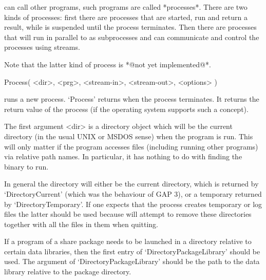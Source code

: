 


{\GAP}  can  call other programs,  such  programs are called *processes*.
There are  two  kinds of processes:  first there  are  processes that are
started, run and  return a result,  while  {\GAP} is suspended  until the
process  terminates.  Then there are  processes that will run in parallel
to {\GAP} as  subprocesses  and {\GAP} can  communicate and   control the
processes using streams.

Note that the latter kind of process is *@not yet implemented@*.


\>Process( <dir>, <prg>, <stream-in>, <stream-out>, <options> )

runs  a new process.  `Process' returns  when the process terminates.  It
returns the return value of the process (if the operating system supports
such a concept).

The first argument <dir> is a directory object which  will be the current
directory (in the usual UNIX  or MSDOS sense) when   the program is  run.
This will  only matter if  the program accesses  files (including running
other programs)  via relative path names.   In particular, it has nothing
to do with finding the binary to run.

In general the  directory will either  be the current directory, which is
returned by `DirectoryCurrent'  (which was the behaviour  of GAP 3), or a
temporary returned  by  `DirectoryTemporary'.  If  one  expects  that the
process creates temporary or log files the latter  should be used because
{\GAP} will attempt  to remove these  directories  together with all  the
files in them when quitting.

If  a program of a  share  package needs  to be  launched  in a directory
relative  to  certain  data    libraries,   then  the first     entry  of
`DirectoryPackageLibrary'    should  be   used.     The     argument   of
`DirectoryPackageLibrary' should be the path to the data library relative
to the package directory.

